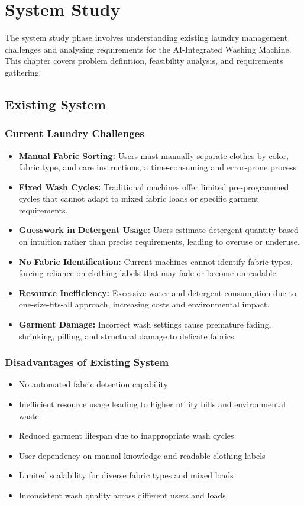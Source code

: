 \chapter{System Study}

The system study phase involves understanding existing laundry management challenges and analyzing requirements for the AI-Integrated Washing Machine. This chapter covers problem definition, feasibility analysis, and requirements gathering.

\section{Existing System}

\subsection{Current Laundry Challenges}
\begin{itemize}
    \item \textbf{Manual Fabric Sorting:} Users must manually separate clothes by color, fabric type, and care instructions, a time-consuming and error-prone process.
    \item \textbf{Fixed Wash Cycles:} Traditional machines offer limited pre-programmed cycles that cannot adapt to mixed fabric loads or specific garment requirements.
    \item \textbf{Guesswork in Detergent Usage:} Users estimate detergent quantity based on intuition rather than precise requirements, leading to overuse or underuse.
    \item \textbf{No Fabric Identification:} Current machines cannot identify fabric types, forcing reliance on clothing labels that may fade or become unreadable.
    \item \textbf{Resource Inefficiency:} Excessive water and detergent consumption due to one-size-fits-all approach, increasing costs and environmental impact.
    \item \textbf{Garment Damage:} Incorrect wash settings cause premature fading, shrinking, pilling, and structural damage to delicate fabrics.
\end{itemize}

\subsection{Disadvantages of Existing System}
\begin{itemize}
    \item No automated fabric detection capability
    \item Inefficient resource usage leading to higher utility bills and environmental waste
    \item Reduced garment lifespan due to inappropriate wash cycles
    \item User dependency on manual knowledge and readable clothing labels
    \item Limited scalability for diverse fabric types and mixed loads
    \item Inconsistent wash quality across different users and loads
\end{itemize}

